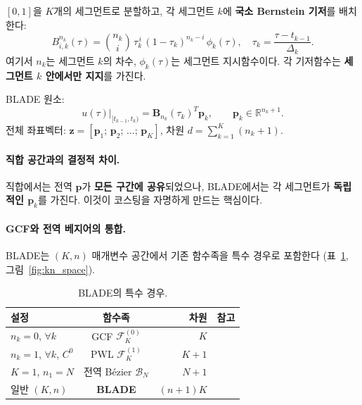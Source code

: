 \documentclass[11pt]{article}
\begin{document}
$[0,1]$을 $K$개의 세그먼트로 분할하고,
각 세그먼트 $k$에 \textbf{국소 Bernstein 기저}를 배치한다:
\begin{equation}\label{eq:local_bernstein}
  B_{i,k}^{n_k}(\tau) = \binom{n_k}{i}\, \tau_k^{\,i}\, (1-\tau_k)^{n_k-i}\, \phi_k(\tau),
  \quad \tau_k = \frac{\tau - t_{k-1}}{\Delta_k}.
\end{equation}
여기서 $n_k$는 세그먼트 $k$의 차수, $\phi_k(\tau)$는 세그먼트 지시함수이다.
각 기저함수는 \textbf{세그먼트 $k$ 안에서만 지지}를 가진다.

BLADE 원소:
\begin{equation}\label{eq:blade_element}
  \boxed{
  u(\tau)\big|_{[t_{k-1}, t_k)} = \mathbf{B}_{n_k}(\tau_k)^T \mathbf{p}_k,
  \qquad \mathbf{p}_k \in \mathbb{R}^{n_k+1}.
  }
\end{equation}
전체 좌표벡터: $\mathbf{z} = [\mathbf{p}_1;\, \mathbf{p}_2;\, \ldots;\, \mathbf{p}_K]$,
차원 $d = \sum_{k=1}^{K}(n_k + 1)$.

\paragraph{직합 공간과의 결정적 차이.}
직합에서는 전역 $\mathbf{p}$가 \textbf{모든 구간에 공유}되었으나,
BLADE에서는 각 세그먼트가 \textbf{독립적인 $\mathbf{p}_k$}를 가진다.
이것이 코스팅을 자명하게 만드는 핵심이다.

\paragraph{GCF와 전역 베지어의 통합.}
BLADE는 $(K, n)$ 매개변수 공간에서 기존 함수족을 특수 경우로 포함한다
(표~\ref{tab:special}, 그림~\ref{fig:kn_space}).

\begin{table}[htb]
\centering
\caption{BLADE의 특수 경우.}
\label{tab:special}
\begin{tabular}{lcrl}
\toprule
설정 & 함수족 & 차원 & 참고 \\
\midrule
$n_k = 0$, $\forall k$ & GCF $\mathcal{F}_K^{(0)}$ & $K$ & \cite{efc001} \\
$n_k = 1$, $\forall k$, $C^0$ & PWL $\mathcal{F}_K^{(1)}$ & $K+1$ & \\
$K = 1$, $n_1 = N$ & 전역 B\'{e}zier $\mathcal{B}_N$ & $N+1$ & \cite{report004} \\
일반 $(K, n)$ & \textbf{BLADE} & $(n{+}1)K$ & \cite{efc005} \\
\bottomrule
\end{tabular}
\end{table}
\end{document}

